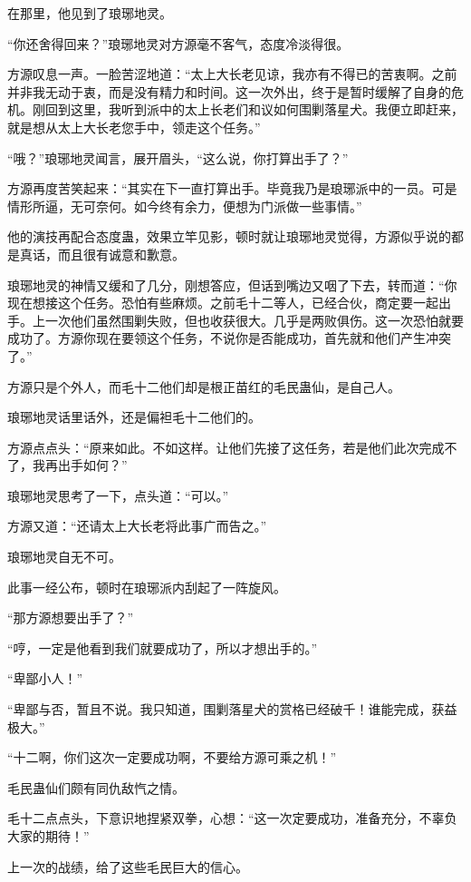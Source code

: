 \begin{this_body}
在那里，他见到了琅琊地灵。

“你还舍得回来？”琅琊地灵对方源毫不客气，态度冷淡得很。

方源叹息一声。一脸苦涩地道：“太上大长老见谅，我亦有不得已的苦衷啊。之前并非我无动于衷，而是没有精力和时间。这一次外出，终于是暂时缓解了自身的危机。刚回到这里，我听到派中的太上长老们和议如何围剿落星犬。我便立即赶来，就是想从太上大长老您手中，领走这个任务。”

“哦？”琅琊地灵闻言，展开眉头，“这么说，你打算出手了？”

方源再度苦笑起来：“其实在下一直打算出手。毕竟我乃是琅琊派中的一员。可是情形所逼，无可奈何。如今终有余力，便想为门派做一些事情。”

他的演技再配合态度蛊，效果立竿见影，顿时就让琅琊地灵觉得，方源似乎说的都是真话，而且很有诚意和歉意。

琅琊地灵的神情又缓和了几分，刚想答应，但话到嘴边又咽了下去，转而道：“你现在想接这个任务。恐怕有些麻烦。之前毛十二等人，已经合伙，商定要一起出手。上一次他们虽然围剿失败，但也收获很大。几乎是两败俱伤。这一次恐怕就要成功了。方源你现在要领这个任务，不说你是否能成功，首先就和他们产生冲突了。”

方源只是个外人，而毛十二他们却是根正苗红的毛民蛊仙，是自己人。

琅琊地灵话里话外，还是偏袒毛十二他们的。

方源点点头：“原来如此。不如这样。让他们先接了这任务，若是他们此次完成不了，我再出手如何？”

琅琊地灵思考了一下，点头道：“可以。”

方源又道：“还请太上大长老将此事广而告之。”

琅琊地灵自无不可。

此事一经公布，顿时在琅琊派内刮起了一阵旋风。

“那方源想要出手了？”

“哼，一定是他看到我们就要成功了，所以才想出手的。”

“卑鄙小人！”

“卑鄙与否，暂且不说。我只知道，围剿落星犬的赏格已经破千！谁能完成，获益极大。”

“十二啊，你们这次一定要成功啊，不要给方源可乘之机！”

毛民蛊仙们颇有同仇敌忾之情。

毛十二点点头，下意识地捏紧双拳，心想：“这一次定要成功，准备充分，不辜负大家的期待！”

上一次的战绩，给了这些毛民巨大的信心。


\end{this_body}
